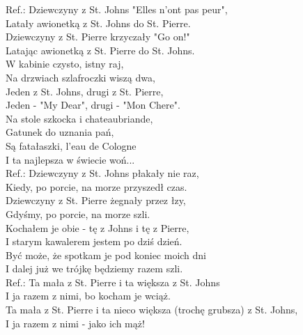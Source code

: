 Ref.: Dziewczyny z St. Johns "Elles n'ont pas peur", \\
Latały awionetką z St. Johns do St. Pierre. \\
Dziewczyny z St. Pierre krzyczały "Go on!" \\
Latając awionetką z St. Pierre do St. Johns. \\

W kabinie czysto, istny raj, \\
Na drzwiach szlafroczki wiszą dwa, \\
Jeden z St. Johns, drugi z St. Pierre, \\
Jeden - "My Dear", drugi - "Mon Chere". \\

Na stole szkocka i chateaubriande, \\
Gatunek do uznania pań, \\
Są fatałaszki, l'eau de Cologne \\
I ta najlepsza w świecie woń... \\

Ref.: Dziewczyny z St. Johns płakały nie raz, \\
Kiedy, po porcie, na morze przyszedł czas. \\
Dziewczyny z St. Pierre żegnały przez łzy, \\
Gdyśmy, po porcie, na morze szli. \\

Kochałem je obie - tę z Johns i tę z Pierre, \\
I starym kawalerem jestem po dziś dzień. \\
Być może, że spotkam je pod koniec moich dni \\
I dalej już we trójkę będziemy razem szli. \\

Ref.: Ta mała z St. Pierre i ta większa z St. Johns \\
I ja razem z nimi, bo kocham je wciąż. \\
Ta mała z St. Pierre i ta nieco większa (trochę grubsza) z St. Johns, \\
I ja razem z nimi - jako ich mąż! \\
